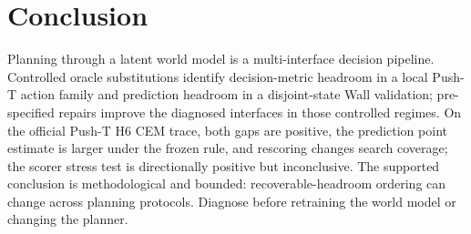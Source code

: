 \section{Conclusion}
\label{sec:conclusion}

Planning through a latent world model is a multi-interface decision pipeline. Controlled oracle substitutions identify decision-metric headroom in a local Push-T action family and prediction headroom in a disjoint-state Wall validation; pre-specified repairs improve the diagnosed interfaces in those controlled regimes. On the official Push-T H6 CEM trace, both gaps are positive, the prediction point estimate is larger under the frozen rule, and rescoring changes search coverage; the scorer stress test is directionally positive but inconclusive. The supported conclusion is methodological and bounded: recoverable-headroom ordering can change across planning protocols. Diagnose before retraining the world model or changing the planner.
